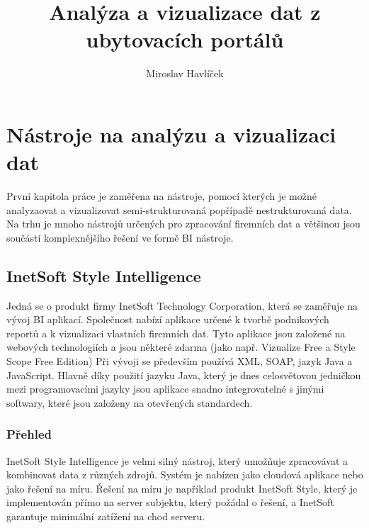 \documentclass[czech,BP]{thesiskiv}
\author{Miroslav Havlíček}
\title{Analýza a vizualizace dat z ubytovacích portálů}
\begin{document}
%
\maketitle
\tableofcontents

\chapter{Nástroje na analýzu a vizualizaci dat }

První kapitola práce je zaměřena na nástroje, pomocí kterých je možné analyzaovat a vizualizovat semi-strukturovaná popřípadě nestrukturovaná data. Na trhu je mnoho nástrojů určených pro zpracování firemních dat a většinou jsou součástí komplexnějšího řešení ve formě BI nástroje.

\section{InetSoft Style Intelligence}
Jedná se o produkt firmy InetSoft Technology Corporation, která  se zaměřuje na vývoj BI aplikací. Společnost nabízí aplikace určené k tvorbě podnikových reportů a k vizualizaci vlastních firemních dat. Tyto aplikace jsou založené na webových technologiích a jsou některé zdarma (jako např. Vizualize Free a Style Scope Free Edition) Při vývoji se především používá XML, SOAP, jazyk Java a JavaScript\cite{InetTechnology}. Hlavně díky použití jazyku Java, který je dnes celosvětovou jedničkou mezi programovacími jazyky \cite{JavaStandings} jsou aplikace snadno integrovatelné s jinými softwary, které jsou založeny na otevřených standardech. 

\subsection{Přehled}
InetSoft Style Intelligence je velmi silný nástroj, který umožňuje zpracovávat a kombinovat data z různých zdrojů. Systém je nabízen jako cloudová aplikace nebo jako řešení na míru. Řešení na míru je například produkt InetSoft Style, který je implementován přímo na server subjektu, který požádal o řešení, a InetSoft garantuje minimální zatížení na chod serveru.
\end{document}
